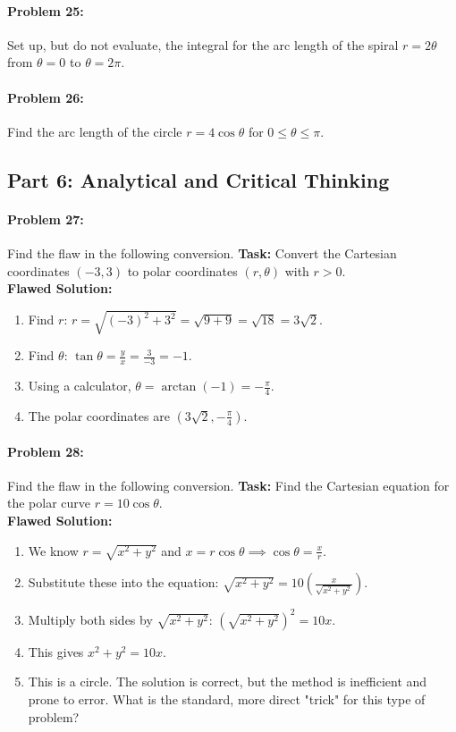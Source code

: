 \documentclass{article}
\begin{document}
\paragraph{Problem 25:} Set up, but do not evaluate, the integral for the arc length of the spiral $r = 2\theta$ from $\theta = 0$ to $\theta = 2\pi$.

\paragraph{Problem 26:} Find the arc length of the circle $r=4\cos\theta$ for $0 \le \theta \le \pi$.

\subsection*{Part 6: Analytical and Critical Thinking}

\paragraph{Problem 27:} Find the flaw in the following conversion.
\textbf{Task:} Convert the Cartesian coordinates $(-3, 3)$ to polar coordinates $(r, \theta)$ with $r>0$. \\
\textbf{Flawed Solution:}
\begin{enumerate}
    \item Find $r$: $r = \sqrt{(-3)^2 + 3^2} = \sqrt{9+9} = \sqrt{18} = 3\sqrt{2}$.
    \item Find $\theta$: $\tan\theta = \frac{y}{x} = \frac{3}{-3} = -1$.
    \item Using a calculator, $\theta = \arctan(-1) = -\frac{\pi}{4}$.
    \item The polar coordinates are $(3\sqrt{2}, -\frac{\pi}{4})$.
\end{enumerate}

\paragraph{Problem 28:} Find the flaw in the following conversion.
\textbf{Task:} Find the Cartesian equation for the polar curve $r = 10\cos\theta$. \\
\textbf{Flawed Solution:}
\begin{enumerate}
    \item We know $r = \sqrt{x^2+y^2}$ and $x = r\cos\theta \implies \cos\theta = \frac{x}{r}$.
    \item Substitute these into the equation: $\sqrt{x^2+y^2} = 10 \left( \frac{x}{\sqrt{x^2+y^2}} \right)$.
    \item Multiply both sides by $\sqrt{x^2+y^2}$: $(\sqrt{x^2+y^2})^2 = 10x$.
    \item This gives $x^2 + y^2 = 10x$.
    \item This is a circle. The solution is correct, but the method is inefficient and prone to error. What is the standard, more direct "trick" for this type of problem?
\end{enumerate}
\end{document}
